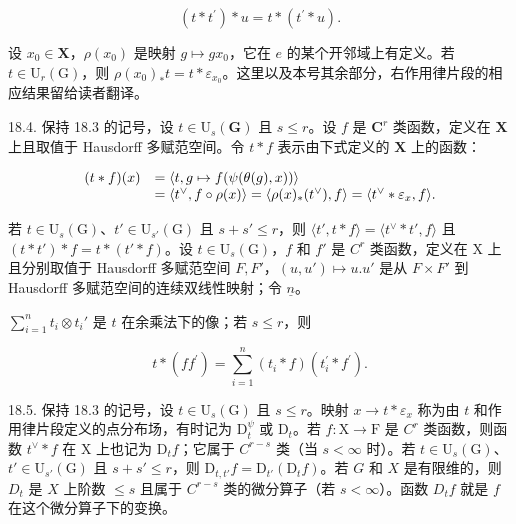\[
(t * t ^ {\prime}) * u = t * (t ^ {\prime} * u).
\]

设 \(x_0 \in \mathbf{X}\)，\(\rho(x_0)\) 是映射 \(g \mapsto gx_0\)，它在 \(e\) 的某个开邻域上有定义。若 \(t \in \mathrm{U}_r(\mathrm{G})\)，则 \(\rho(x_0)_*t = t * \varepsilon_{x_0}\)。这里以及本号其余部分，右作用律片段的相应结果留给读者翻译。

18.4. 保持 18.3 的记号，设 \(t \in \mathrm{U}_s(\mathbf{G})\) 且 \(s \leqslant r\)。设 \(f\) 是 \(\mathbf{C}^r\) 类函数，定义在 \(\mathbf{X}\) 上且取值于 Hausdorff 多赋范空间。令 \(t * f\) 表示由下式定义的 \(\mathbf{X}\) 上的函数：

\[
\begin{array}{r l} (t * f) (x) & = \langle t, g \mapsto f (\psi (\theta (g), x)) \rangle \\ & = \langle t ^ {\vee}, f \circ \rho (x) \rangle = \langle \rho (x) _ {*} (t ^ {\vee}), f \rangle = \langle t ^ {\vee} * \varepsilon_ {x}, f \rangle . \end{array}
\]

若 \(t \in \mathrm{U}_s(\mathrm{G})\)、\(t' \in \mathrm{U}_{s'}(\mathrm{G})\) 且 \(s + s' \leqslant r\)，则 \(\langle t', t * f \rangle = \langle t^\vee * t', f \rangle\) 且 \((t * t') * f = t * (t' * f)\)。设 \(t \in \mathrm{U}_s(\mathrm{G})\)，\(f\) 和 \(f'\) 是 \(C^r\) 类函数，定义在 X 上且分别取值于 Hausdorff 多赋范空间 \(F, F'\)，\((u, u') \mapsto u. u'\) 是从 \(F \times F'\) 到 Hausdorff 多赋范空间的连续双线性映射；令 \(\underline{n}\)。

\(\sum_{i=1}^{n} t_i \otimes t_i'\) 是 \(t\) 在余乘法下的像；若 \(s \leqslant r\)，则

\[
t * (f f ^ {\prime}) = \sum_ {i = 1} ^ {n} (t _ {i} * f) (t _ {i} ^ {\prime} * f ^ {\prime}).
\]

18.5. 保持 18.3 的记号，设 \(t \in \mathrm{U}_s(\mathrm{G})\) 且 \(s \leqslant r\)。映射 \(x \to t * \varepsilon_x\) 称为由 \(t\) 和作用律片段定义的点分布场，有时记为 \(\mathrm{D}_t^{\psi}\) 或 \(\mathrm{D}_t\)。若 \(f: \mathrm{X} \to \mathrm{F}\) 是 \(C^r\) 类函数，则函数 \(t^{\vee} * f\) 在 \(\mathrm{X}\) 上也记为 \(\mathrm{D}_t f\)；它属于 \(C^{r - s}\) 类（当 \(s < \infty\) 时）。若 \(t \in \mathrm{U}_s(\mathrm{G})\)、\(t' \in \mathrm{U}_{s'}(\mathrm{G})\) 且 \(s + s' \leqslant r\)，则 \(\mathrm{D}_{t,t'} f = \mathrm{D}_{t'}(\mathrm{D}_t f)\)。若 \(G\) 和 \(X\) 是有限维的，则 \(D_t\) 是 \(X\) 上阶数 \(\leqslant s\) 且属于 \(C^{r - s}\) 类的微分算子（若 \(s < \infty\)）。函数 \(D_t f\) 就是 \(f\) 在这个微分算子下的变换。

